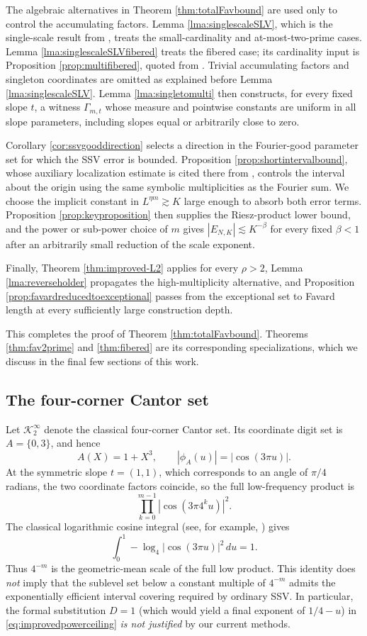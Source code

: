 \documentclass[12pt]{amsart}
\numberwithin{equation}{section}
\begin{document}
The algebraic alternatives in Theorem \ref{thm:totalFavbound} are used only
to control the accumulating factors.  Lemma \ref{lma:singlescaleSLV}, which
is the single-scale result from \cite{LM}, treats the small-cardinality and
at-most-two-prime cases.  Lemma \ref{lma:singlescaleSLVfibered} treats the
fibered case; its cardinality input is Proposition
\ref{prop:multifibered}, quoted from \cite[Proposition 3.2]{KLMS}.  Trivial
accumulating factors and singleton coordinates are omitted as explained
before Lemma \ref{lma:singlescaleSLV}.  Lemma
\ref{lma:singletomulti} then constructs, for every fixed slope $t$, a witness
$\Gamma_{m,t}$ whose measure and pointwise constants are uniform in all slope
parameters, including slopes equal or arbitrarily close to zero.

Corollary \ref{cor:ssvgooddirection} selects a direction in the
Fourier-good parameter set for which the SSV error is bounded.  Proposition
\ref{prop:shortintervalbound}, whose auxiliary localization estimate is
cited there from \cite{BThesis,BV3}, controls the interval about the origin
using the same symbolic multiplicities as the Fourier sum.  We choose the
implicit constant in $L^{\eta m}\gtrsim K$ large enough to absorb both error
terms.  Proposition \ref{prop:keyproposition} then supplies the Riesz-product
lower bound, and the power or sub-power choice of $m$ gives
$|E_{N,K}|\lesssim K^{-\beta}$ for every fixed $\beta<1$ after an arbitrarily
small reduction of the scale exponent.

Finally, Theorem \ref{thm:improved-L2} applies for every $\rho>2$, Lemma
\ref{lma:reverseholder} propagates the high-multiplicity alternative, and
Proposition \ref{prop:favardreducedtoexceptional} passes from the exceptional
set to Favard length at every sufficiently large construction depth.  

This
completes the proof of Theorem \ref{thm:totalFavbound}.  Theorems
\ref{thm:fav2prime} and \ref{thm:fibered} are its corresponding
specializations, which we discuss in the final few sections of this work.

\subsection{The four-corner Cantor set}

Let $\mathcal K_2^\infty$ denote the classical four-corner Cantor set.  Its
coordinate digit set is $A=\{0,3\}$, and hence
\[
 A(X)=1+X^3,
 \qquad
 |\phi_A(u)|=|\cos(3\pi u)|.
\]
At the symmetric slope $t = (1,1)$, which corresponds to an angle of $\pi /4$ radians, the two coordinate factors coincide, so the full
low-frequency product is
\[
 \prod_{k=0}^{m-1}|\cos(3\pi4^ku)|^2.
\]
The classical logarithmic cosine integral (see, for example,
\cite[Chapter V]{Zygmund}) gives
\[
 \int_0^1-\log_4|\cos(3\pi u)|^2\,du=1.
\]
Thus $4^{-m}$ is the geometric-mean scale of the full low product.  This
identity does \emph{not} imply that the sublevel set below a constant multiple
of $4^{-m}$ admits the exponentially efficient interval covering required by
ordinary SSV.  In particular, the formal substitution $D=1$ (which would yield a final exponent of $1/4 -u$) in
\eqref{eq:improvedpowerceiling} \textit{is not justified} by our current methods.
\end{document}
